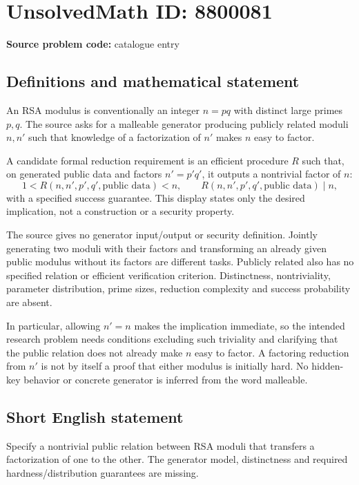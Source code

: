 \documentclass[11pt]{article}
\begin{document}
\section*{UnsolvedMath ID: 8800081}
\textbf{Source problem code:} catalogue entry
\subsection{Definitions and mathematical statement}
An RSA modulus is conventionally an integer $n=pq$ with distinct large primes $p,q$. The source asks for a malleable generator producing publicly related moduli $n,n'$ such that knowledge of a factorization of $n'$ makes $n$ easy to factor.

A candidate formal reduction requirement is an efficient procedure $R$ such that, on generated public data and factors $n'=p'q'$, it outputs a nontrivial factor of $n$:
\[
1<R(n,n',p',q',\text{public data})<n,\qquad
R(n,n',p',q',\text{public data})\mid n,
\]
with a specified success guarantee. This display states only the desired implication, not a construction or a security property.

The source gives no generator input/output or security definition. Jointly generating two moduli with their factors and transforming an already given public modulus without its factors are different tasks. Publicly related also has no specified relation or efficient verification criterion. Distinctness, nontriviality, parameter distribution, prime sizes, reduction complexity and success probability are absent.

In particular, allowing $n'=n$ makes the implication immediate, so the intended research problem needs conditions excluding such triviality and clarifying that the public relation does not already make $n$ easy to factor. A factoring reduction from $n'$ is not by itself a proof that either modulus is initially hard. No hidden-key behavior or concrete generator is inferred from the word malleable.
\subsection{Short English statement}
Specify a nontrivial public relation between RSA moduli that transfers a factorization of one to the other. The generator model, distinctness and required hardness/distribution guarantees are missing.
\end{document}
